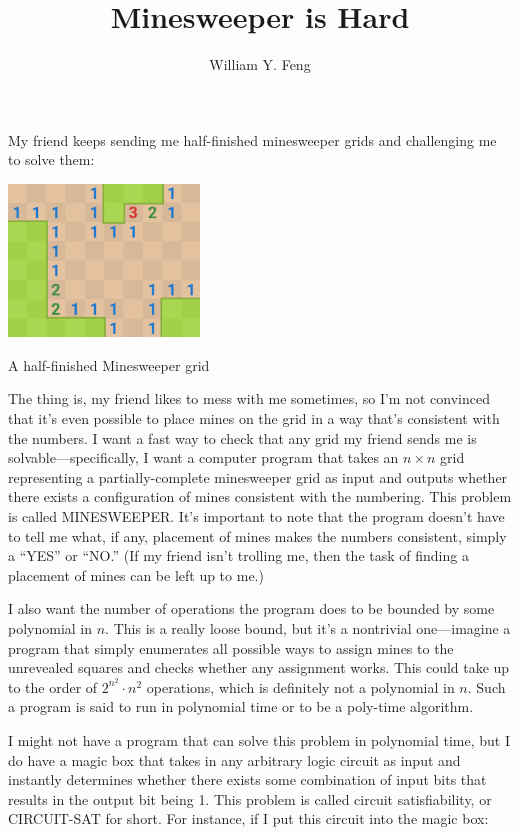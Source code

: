 \documentclass{article}
\title{Minesweeper is Hard}
\author{William Y. Feng}
\begin{document}
\maketitle
My friend keeps sending me half-finished minesweeper grids and challenging me to solve them:
\begin{center}
    \includegraphics[width=2in]{images/Minesweeper_fig1.png}
    
    \small{A half-finished Minesweeper grid}
\end{center}

The thing is, my friend likes to mess with me sometimes, so I’m not convinced that it’s even possible to place mines on the grid in a way that’s consistent with the numbers. I want a fast way to check that any grid my friend sends me is solvable---specifically, I want a computer program that takes an $n \times n$ grid representing a partially-complete minesweeper grid as input and outputs whether there exists a configuration of mines consistent with the numbering. This problem is called MINESWEEPER. It’s important to note that the program doesn’t have to tell me what, if any, placement of mines makes the numbers consistent, simply a  “YES” or “NO.” (If my friend isn’t trolling me, then the task of finding a placement of mines can be left up to me.)

I also want the number of operations the program does to be bounded by some polynomial in $n$. This is a really loose bound, but it’s a nontrivial one---imagine a program that simply enumerates all possible ways to assign mines to the unrevealed squares and checks whether any assignment works. This could take up to the order of $2^{n^2} \cdot n^2$ operations, which is definitely not a polynomial in $n$. Such a program is said to run in polynomial time or to be a poly-time algorithm.


I might not have a program that can solve this problem in polynomial time, but I do have a magic box that takes in any arbitrary logic circuit as input and instantly determines whether there exists some combination of input bits that results in the output bit being 1. This problem is called circuit satisfiability, or CIRCUIT-SAT for short. For instance, if I put this circuit into the magic box:
\end{document}
